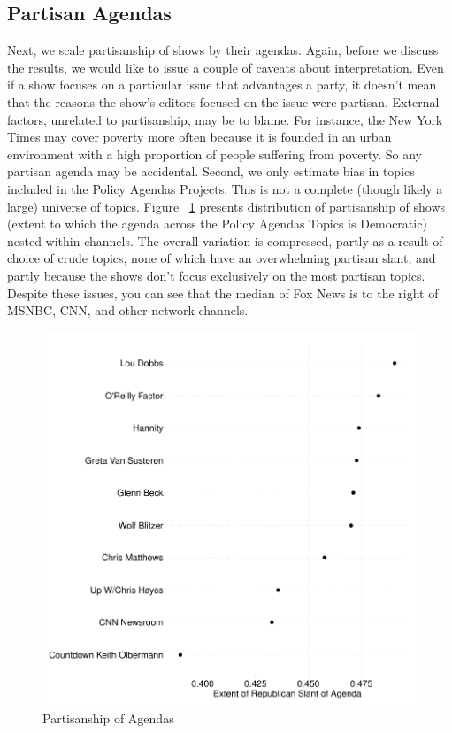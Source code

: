 \documentclass[12pt, letterpaper]{article}
\begin{document}
\subsection*{Partisan Agendas}

Next, we scale partisanship of shows by their agendas. Again, before we discuss the results, we would like to issue a couple of caveats about interpretation. Even if a show focuses on a particular issue that advantages a party, it doesn't mean that the reasons the show's editors focused on the issue were partisan. External factors, unrelated to partisanship, may be to blame. For instance, the New York Times may cover poverty more often because it is founded in an urban environment with a high proportion of people suffering from poverty. So any partisan agenda may be accidental. Second, we only estimate bias in topics included in the Policy Agendas Projects. This is not a complete (though likely a large) universe of topics. Figure ~\ref{pagenda} presents distribution of partisanship of shows (extent to which the agenda across the Policy Agendas Topics is Democratic) nested within channels. The overall variation is compressed, partly as a result of choice of crude topics, none of which have an overwhelming partisan slant, and partly because the shows don't focus exclusively on the most partisan topics. Despite these issues, you can see that the median of Fox News is to the right of MSNBC, CNN, and other network channels.  

\begin{figure}[H]
\centering
\caption{Partisanship of Agendas}\label{pagenda}
\includegraphics[width=.75\textwidth]{../figs/partisanship_of_agenda.pdf}
\end{figure}
\end{document}
